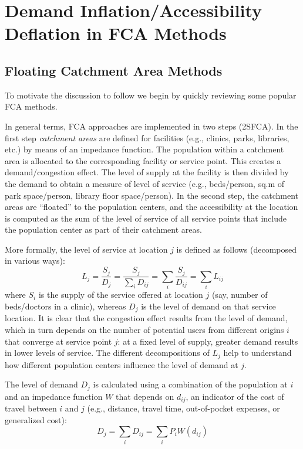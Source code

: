 \documentclass[10pt,letterpaper]{article}
\begin{document}
\section{Demand Inflation/Accessibility Deflation in FCA
Methods}\label{demand-inflationaccessibility-deflation-in-fca-methods}

\subsection{Floating Catchment Area
Methods}\label{floating-catchment-area-methods}

To motivate the discussion to follow we begin by quickly reviewing some
popular FCA methods.

In general terms, FCA approaches are implemented in two steps (2SFCA).
In the first step \emph{catchment areas} are defined for facilities
(e.g., clinics, parks, libraries, etc.) by means of an impedance
function. The population within a catchment area is allocated to the
corresponding facility or service point. This creates a
demand/congestion effect. The level of supply at the facility is then
divided by the demand to obtain a measure of level of service (e.g.,
beds/person, sq.m of park space/person, library floor space/person). In
the second step, the catchment areas are ``floated'' to the population
centers, and the accessibility at the location is computed as the sum of
the level of service of all service points that include the population
center as part of their catchment areas.

More formally, the level of service at location \(j\) is defined as
follows (decomposed in various ways): \[
L_j = \frac{S_j}{D_j} = \frac{S_j}{\sum_iD_{ij}} = \sum_i\frac{S_j}{D_{ij}}=\sum_iL_{ij}
\] where \(S_i\) is the supply of the service offered at location \(j\)
(say, number of beds/doctors in a clinic), whereas \(D_j\) is the level
of demand on that service location. It is clear that the congestion
effect results from the level of demand, which in turn depends on the
number of potential users from different origins \(i\) that converge at
service point \(j\): at a fixed level of supply, greater demand results
in lower levels of service. The different decompositions of \(L_j\) help
to understand how different population centers influence the level of
demand at \(j\).

The level of demand \(D_{j}\) is calculated using a combination of the
population at \(i\) and an impedance function \(W\) that depends on
\(d_{ij}\), an indicator of the cost of travel between \(i\) and \(j\)
(e.g., distance, travel time, out-of-pocket expenses, or generalized
cost): \[
D_j = \sum_i{D_{ij}} = \sum_i{P_iW(d_{ij})}
\]
\end{document}
